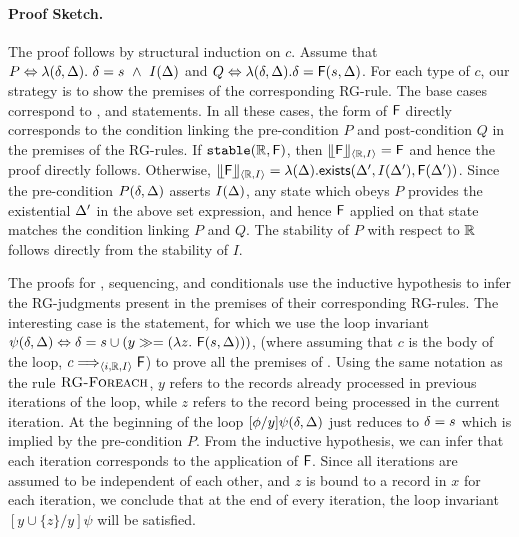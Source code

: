 \paragraph{{\sc Proof Sketch.}} 
The proof follows by structural induction on $c$. Assume that $P
\Leftrightarrow \lambda(\delta,\Delta).~\delta=s ~\wedge~ I(\Delta)$ and $Q
\Leftrightarrow \lambda(\delta,\Delta).\delta = {\sf F}(s,\Delta)$. For each type
of $c$, our strategy is to show the premises of the corresponding
RG-rule. The base cases correspond to ,  and 
statements. In all these cases, the form of ${\sf F}$ directly corresponds
to the condition linking the pre-condition $P$ and post-condition $Q$
in the premises of the RG-rules. If $\mathtt{stable}(\mathbb{R}, {\sf F})$, then
$\llfloor {\sf F} \rrfloor_{\langle \mathbb{R},I \rangle} = {\sf F}$ and hence the proof directly follows. Otherwise,
$\llfloor {\sf F} \rrfloor_{\langle \mathbb{R},I \rangle} = \lambda (\Delta).{\sf exists}(\Delta', I(\Delta'),
{\sf F}( \Delta'))$. Since the pre-condition $P(\delta, \Delta)$ asserts
$I(\Delta)$, any state which obeys $P$ provides the existential $\Delta'$
in the above set expression, and hence ${\sf F}$ applied on that state
matches the condition linking $P$ and $Q$. The stability of $P$ with
respect to $\mathbb{R}$ follows directly from the stability of $I$.

The proofs for , sequencing, and conditionals use the
inductive hypothesis to infer the RG-judgments present in the
premises of their corresponding RG-rules. The interesting case is the
 statement, for which we use the loop invariant
$\psi(\delta, \Delta) \Leftrightarrow \delta = s \cup (y \gg= (\lambda
z.~{\sf F}(s, \Delta)))$, (where assuming that $c$ is the body of the loop,
$c \Longrightarrow_{\langle i,\mathbb{R},I \rangle} {\sf F}$) to prove all the premises of
. Using the same notation as the rule
$\textrm{\sc {RG-Foreach}}$, $y$ refers to the records already processed
in previous iterations of the loop, while $z$ refers to the record
being processed in the current iteration.  At the beginning of the
loop $[\phi/y]\psi(\delta, \Delta)$ just reduces to $\delta = s$ which is
implied by the pre-condition $P$. From the inductive hypothesis, we
can infer that each iteration corresponds to the application of
${\sf F}$. Since all iterations are assumed to be independent of each other,
and $z$ is bound to a record in $x$ for each iteration, we conclude
that at the end of every iteration, the loop invariant $[y \cup
  \{z\}/y]\psi$ will be satisfied.

